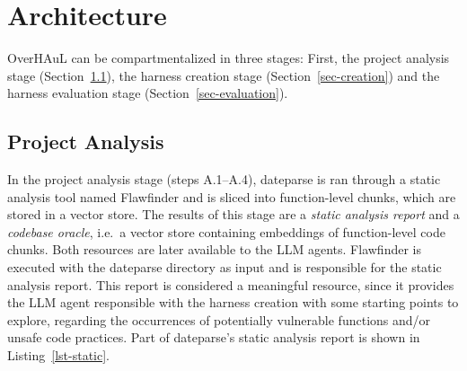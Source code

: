 \documentclass[
  a4paper,
]{scrreprt}
\theoremstyle{definition}
\theoremstyle{remark}
\begin{document}
\section{Architecture}\label{sec-architecture}

OverHAuL can be compartmentalized in three stages: First, the project
analysis stage (Section~\ref{sec-analysis}), the harness creation stage
(Section~\ref{sec-creation}) and the harness evaluation stage
(Section~\ref{sec-evaluation}).

\subsection{Project Analysis}\label{sec-analysis}

In the project analysis stage (steps A.1--A.4), dateparse is ran through
a static analysis tool named Flawfinder \autocite{flawfinder} and is
sliced into function-level chunks, which are stored in a vector store.
The results of this stage are a \emph{static analysis report} and a
\emph{codebase oracle}, i.e.~a vector store containing embeddings of
function-level code chunks. Both resources are later available to the
LLM agents. Flawfinder is executed with the dateparse directory as input
and is responsible for the static analysis report. This report is
considered a meaningful resource, since it provides the LLM agent
responsible with the harness creation with some starting points to
explore, regarding the occurrences of potentially vulnerable functions
and/or unsafe code practices. Part of dateparse's static analysis report
is shown in Listing~\ref{lst-static}.
\end{document}
